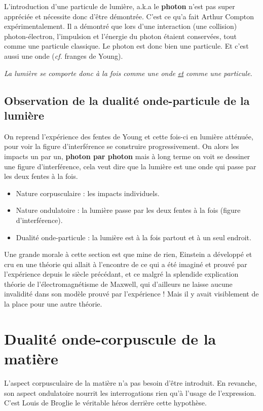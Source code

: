 \documentclass[../notesdecours]{subfiles}
\begin{document}
L'introduction d'une particule de lumière, a.k.a le \textbf{photon} n'est pas super appréciée et nécessite donc d'être démontrée. C'est ce qu'a fait Arthur Compton expérimentalement. Il a démontré que lors d'une interaction (une collision) photon-électron, l'impulsion et l'énergie du photon étaient conservées, tout comme une particule classique. Le photon est donc bien une particule. Et c'est aussi une onde (\textit{cf.} franges de Young). 
\begin{center}
\begin{large}
\textit{La lumière se comporte donc à la fois comme une onde \underline{et} comme une particule.}
\end{large}
\end{center}

\subsection{Observation de la dualité onde-particule de la lumière}
On reprend l'expérience des fentes de Young et cette fois-ci en lumière atténuée, pour voir la figure d'interférence se construire progressivement. On alors les impacts un par un, \textbf{photon par photon} mais à long terme on voit se dessiner une figure d'interférence, cela veut dire que la lumière est une onde qui passe par les deux fentes à la fois.

\begin{itemize}
\item Nature corpusculaire : les impacts individuels.
\item Nature ondulatoire : la lumière passe par les deux fentes à la fois (figure d'interférence).
\item Dualité onde-particule : la lumière est à la fois partout et à un seul endroit. \end{itemize}

Une grande morale à cette section est que mine de rien, Einstein a développé et cru en une théorie qui allait à l'encontre de ce qui a été imaginé et prouvé par l'expérience depuis le siècle précédant, et ce malgré la splendide explication théorie de l'électromagnétisme de Maxwell, qui d'ailleurs ne laisse aucune invalidité dans son modèle prouvé par l'expérience ! Mais il y avait visiblement de la place pour une autre théorie. 

\section{Dualité onde-corpuscule de la matière}
L'aspect corpusculaire de la matière n'a pas besoin d'être introduit. En revanche, son aspect ondulatoire nourrit les interrogations rien qu'à l'usage de l'expression. C'est Louis de Broglie le véritable héros derrière cette hypothèse.
\end{document}
